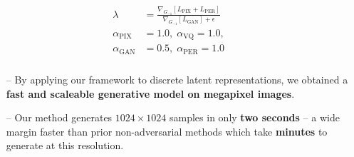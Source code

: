 \documentclass[14pt,margin=0.5in,innermargin=0in,blockverticalspace=-0.1in,colspace=-1.2cm]{tikzposter}
\begin{document}
\begin{columns}
{\begin{tcolorbox}[boxsep=0pt,top=0cm,bottom=0.0cm,adjusted title={\huge\bf Proposed Method},colbacktitle=colorOne]
{\begin{minipage}{0.49\linewidth}
\begin{align*}
            \begin{split}
                \lambda &= \frac{\nabla_{G_{-1}}[L_\text{PIX} +
                L_\text{PER}]}{\nabla_{G_{-1}}[L_\text{GAN}] + \epsilon}\\
                \alpha_\text{PIX} &= 1.0,\; \alpha_\text{VQ} = 1.0,\\
                \alpha_\text{GAN} &= 0.5,\; \alpha_\text{PER} = 1.0 \\
            \end{split}
            \end{align*}
        \end{minipage}
            }
        \vspace{0.4cm}
        {
        \Large
        \begin{itemize}
            \item[--] By applying our framework to discrete latent
                representations, we obtained a \textbf{fast and scaleable generative
                model on megapixel images}.
            \item[--] Our method generates $1024 \times 1024$ samples in only
                \textbf{two seconds} -- a wide margin faster than prior non-adversarial
                methods which take \textbf{minutes} to generate at this resolution.
        \end{itemize}
        }


\end{tcolorbox}}
\end{columns}
\end{document}
